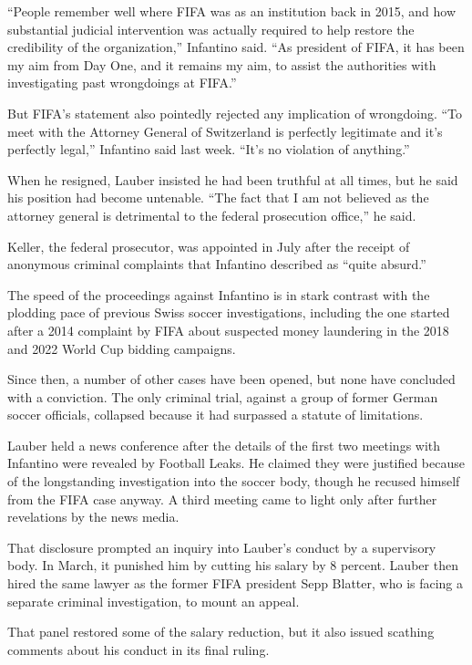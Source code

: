 ``People remember well where FIFA was as an institution back in 2015,
and how substantial judicial intervention was actually required to help
restore the credibility of the organization,'' Infantino said. ``As
president of FIFA, it has been my aim from Day One, and it remains my
aim, to assist the authorities with investigating past wrongdoings at
FIFA.''

But FIFA's statement also pointedly rejected any implication of
wrongdoing. ``To meet with the Attorney General of Switzerland is
perfectly legitimate and it's perfectly legal,'' Infantino said last
week. ``It's no violation of anything.''

When he resigned, Lauber insisted he had been truthful at all times, but
he said his position had become untenable. ``The fact that I am not
believed as the attorney general is detrimental to the federal
prosecution office,'' he said.

Keller, the federal prosecutor, was appointed in July after the receipt
of anonymous criminal complaints that Infantino described as ``quite
absurd.''

The speed of the proceedings against Infantino is in stark contrast with
the plodding pace of previous Swiss soccer investigations, including the
one started after a 2014 complaint by FIFA about suspected money
laundering in the 2018 and 2022 World Cup bidding campaigns.

Since then, a number of other cases have been opened, but none have
concluded with a conviction. The only criminal trial, against a group of
former German soccer officials, collapsed because it had surpassed a
statute of limitations.

Lauber held a news conference after the details of the first two
meetings with Infantino were revealed by Football Leaks. He claimed they
were justified because of the longstanding investigation into the soccer
body, though he recused himself from the FIFA case anyway. A third
meeting came to light only after further revelations by the news media.

That disclosure prompted an inquiry into Lauber's conduct by a
supervisory body. In March, it punished him by cutting his salary by 8
percent. Lauber then hired the same lawyer as the former FIFA president
Sepp Blatter, who is facing a separate criminal investigation, to mount
an appeal.

That panel restored some of the salary reduction, but it also issued
scathing comments about his conduct in its final ruling.

